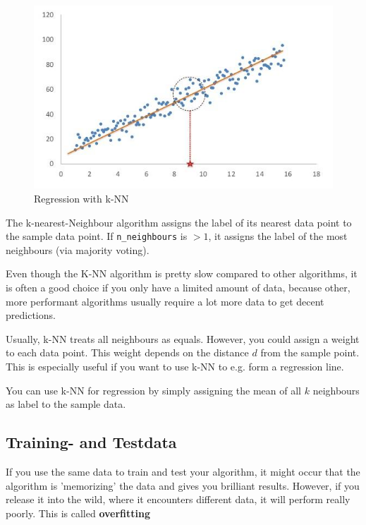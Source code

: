 \documentclass[11pt]{article}
\newcommand{\code}[1]{\texttt{#1}}
\begin{document}
\vspace{10px}

\begin{figure}
    \centering
    \includegraphics[keepaspectratio=true,height=12\baselineskip]{k-nn-regression.jpg}
    \caption{Regression with k-NN}
    \label{fig:knn-regression}
\end{figure}

The k-nearest-Neighbour algorithm assigns the label of its nearest data point to the sample data point. If \code{n\_neighbours} is $>1$, it assigns the label of the most neighbours (via majority voting).

\vspace{10px}

Even though the K-NN algorithm is pretty slow compared to other algorithms, it is often a good choice if you only have a limited amount of data, because other, more performant algorithms usually require a lot more data to get decent predictions.

Usually, k-NN treats all neighbours as equals. However, you could assign a weight to each data point. This weight depends on the distance $d$ from the sample point. This is especially useful if you want to use k-NN to e.g. form a regression line.

You can use k-NN for regression by simply assigning the mean of all $k$ neighbours as label to the sample data.

\subsection{Training- and Testdata}
If you use the same data to train and test your algorithm, it might occur that the algorithm is 'memorizing' the data and gives you brilliant results. However, if you release it into the wild, where it encounters different data, it will perform really poorly. This is called \textbf{overfitting}
\end{document}
